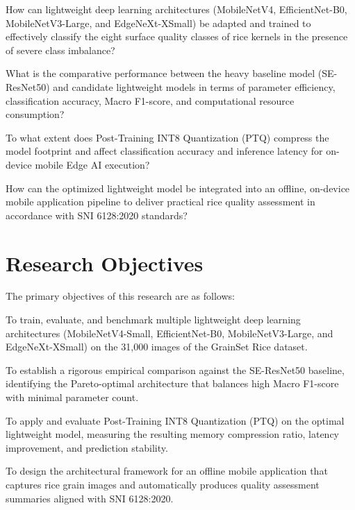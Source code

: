 	\begin{secenumerate}
		\item How can lightweight deep learning architectures (MobileNetV4, EfficientNet-B0, MobileNetV3-Large, and EdgeNeXt-XSmall) be adapted and trained to effectively classify the eight surface quality classes of rice kernels in the presence of severe class imbalance?
		\item What is the comparative performance between the heavy baseline model (SE-ResNet50) and candidate lightweight models in terms of parameter efficiency, classification accuracy, Macro F1-score, and computational resource consumption?
		\item To what extent does Post-Training INT8 Quantization (PTQ) compress the model footprint and affect classification accuracy and inference latency for on-device mobile Edge AI execution?
		\item How can the optimized lightweight model be integrated into an offline, on-device mobile application pipeline to deliver practical rice quality assessment in accordance with SNI 6128:2020 standards?
	\end{secenumerate}
	
	\section{Research Objectives}
	The primary objectives of this research are as follows:
	\begin{secenumerate}
		\item To train, evaluate, and benchmark multiple lightweight deep learning architectures (MobileNetV4-Small, EfficientNet-B0, MobileNetV3-Large, and EdgeNeXt-XSmall) on the 31,000 images of the GrainSet Rice dataset.
		\item To establish a rigorous empirical comparison against the SE-ResNet50 baseline, identifying the Pareto-optimal architecture that balances high Macro F1-score with minimal parameter count.
		\item To apply and evaluate Post-Training INT8 Quantization (PTQ) on the optimal lightweight model, measuring the resulting memory compression ratio, latency improvement, and prediction stability.
		\item To design the architectural framework for an offline mobile application that captures rice grain images and automatically produces quality assessment summaries aligned with SNI 6128:2020.
	\end{secenumerate}
	

